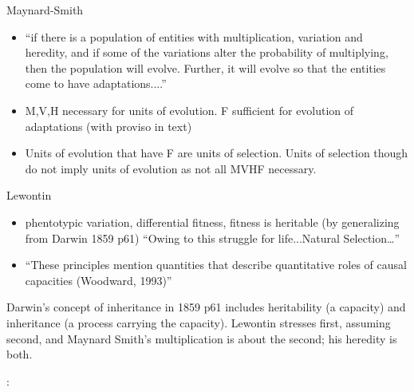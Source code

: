 Maynard-Smith
\begin{itemize}
	\item
	
	``if there is a population of entities with multiplication,
	variation and heredity, and if some of the variations alter the
	probability of multiplying, then the population will evolve.
	Further, it will evolve so that the entities come to have
	adaptations....''
	
	\item
	
	M,V,H necessary for units of evolution. F sufficient for evolution
	of adaptations (with proviso in text)
	
	\item
	
	Units of evolution that have F are units of selection. Units of
	selection though do not imply units of evolution as not all MVHF
	necessary.
	
\end{itemize}

Lewontin
\begin{itemize}
	\item
	
	phentotypic variation, differential fitness, fitness is heritable
	(by generalizing from Darwin 1859 p61) ``Owing to this struggle for
	life...Natural Selection\ldots{}''
	
	\item
	
	``These principles mention quantities that describe quantitative
	roles of causal capacities (Woodward, 1993)''
	
\end{itemize}

Darwin's concept of inheritance in 1859 p61 includes heritability (a capacity) and inheritance (a process carrying the capacity). Lewontin stresses first, assuming second, and Maynard Smith's multiplication is about the second; his heredity is both. \autocite{Griesemer2001}


\autocite{Godfrey-Smith2007}:

